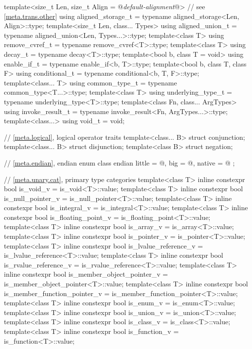 \begin{codeblock}
{  template<size_t Len, size_t Align = @\textit{default-alignment}@> // see \ref{meta.trans.other}
    using aligned_storage_t = typename aligned_storage<Len, Align>::type;
  template<size_t Len, class... Types>
    using aligned_union_t   = typename aligned_union<Len, Types...>::type;
  template<class T>
    using remove_cvref_t    = typename remove_cvref<T>::type;
  template<class T>
    using decay_t           = typename decay<T>::type;
  template<bool b, class T = void>
    using enable_if_t       = typename enable_if<b, T>::type;
  template<bool b, class T, class F>
    using conditional_t     = typename conditional<b, T, F>::type;
  template<class... T>
    using common_type_t     = typename common_type<T...>::type;
  template<class T>
    using underlying_type_t = typename underlying_type<T>::type;
  template<class Fn, class... ArgTypes>
    using invoke_result_t   = typename invoke_result<Fn, ArgTypes...>::type;
  template<class...>
    using void_t            = void;

  // \ref{meta.logical}, logical operator traits
  template<class... B> struct conjunction;
  template<class... B> struct disjunction;
  template<class B> struct negation;

  // \ref{meta.endian}, endian
  enum class endian {
    little = @\seebelow@,
    big    = @\seebelow@,
    native = @\seebelow@
  };

  // \ref{meta.unary.cat}, primary type categories
  template<class T>
    inline constexpr bool is_void_v = is_void<T>::value;
  template<class T>
    inline constexpr bool is_null_pointer_v = is_null_pointer<T>::value;
  template<class T>
    inline constexpr bool is_integral_v = is_integral<T>::value;
  template<class T>
    inline constexpr bool is_floating_point_v = is_floating_point<T>::value;
  template<class T>
    inline constexpr bool is_array_v = is_array<T>::value;
  template<class T>
    inline constexpr bool is_pointer_v = is_pointer<T>::value;
  template<class T>
    inline constexpr bool is_lvalue_reference_v = is_lvalue_reference<T>::value;
  template<class T>
    inline constexpr bool is_rvalue_reference_v = is_rvalue_reference<T>::value;
  template<class T>
    inline constexpr bool is_member_object_pointer_v = is_member_object_pointer<T>::value;
  template<class T>
    inline constexpr bool is_member_function_pointer_v = is_member_function_pointer<T>::value;
  template<class T>
    inline constexpr bool is_enum_v = is_enum<T>::value;
  template<class T>
    inline constexpr bool is_union_v = is_union<T>::value;
  template<class T>
    inline constexpr bool is_class_v = is_class<T>::value;
  template<class T>
    inline constexpr bool is_function_v = is_function<T>::value;

}
\end{codeblock}
